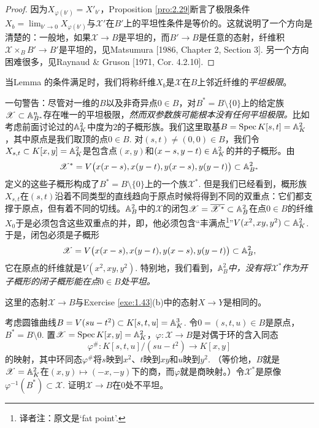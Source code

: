 \begin{proof}
因为$X_{\varphi(b')}=X'_{b'}$，Proposition \ref{pro:2.29}断言了极限条件$X_b=\lim_{b'\to 0}X_{\varphi(b')}$与$\mathscr{X}'$在$B'$上的平坦性条件是等价的。这就说明了一个方向是清楚的：一般地，如果$\mathscr{X}\to B$是平坦的，而$B'\to B$是任意的态射，纤维积$\mathscr{X}\times_B B'\to B'$是平坦的，见Matsumura [1986, Chapter 2, Section 3]. 另一个方向困难很多，见Raynaud \& Gruson [1971, Cor. 4.2.10].
\end{proof}

当Lemma \thethm 的条件满足时，我们将称纤维$X_b$是$\mathscr{X}$在$B$上邻近纤维的\textit{平坦极限}。

一句警告：尽管对一维的$B$以及非奇异点$0\in B$，对$B^*=B\setminus \{0\}$上的给定族$\mathscr{X}\subset \mathbb{A}_{B^*}^n$存在唯一的平坦极限，\textit{然而双参数族可能根本没有任何平坦极限。}比如考虑前面讨论过的$\mathbb{A}_K^2$中度为$2$的子概形族。我们这里取基$B=\operatorname{Spec} K[s,t]=\mathbb{A}_{K}^2$，其中原点是我们取顶的点$0\in B$. 对$(s,t)\neq (0,0)\in B$，我们令$X_{s,t}\subset K[x,y]=\mathbb{A}_K^2$是包含点$(x,y)$和$(x-s,y-t)\in \mathbb{A}_K^2$的并的子概形。由
\[
	\mathscr{X}^*=V\bigl(x(x-s),x(y-t),y(x-s),y(y-t)\bigr)\subset \mathbb{A}_{B^*}^2
\]
定义的这些子概形构成了$B^*=B\setminus \{0\}$上的一个族$\mathscr{X}^*$. 但是我们已经看到，概形族$X_{s,t}$在$(s,t)$沿着不同类型的直线趋向于原点时候将得到不同的双重点：它们都支撑于原点，但有着不同的切线。$\mathbb{A}_B^2$中的$\mathscr{X}$的闭包$\mathscr{X}=\overline{\mathscr{X}^*}\subset \mathbb{A}_B^2$在点$0\in B$的纤维$X_0$于是必须包含这些双重点的并，即，他必须包含“丰满点\footnote{译者注：原文是`fat point'.}”$V(x^2,xy,y^2)\subset \mathbb{A}_K^2$. 于是，闭包必须是子概形
\[
	\mathscr{X}=V\bigl(x(x-s),x(y-t),y(x-s),y(y-t)\bigr)\subset \mathbb{A}_{B}^2,
\]
它在原点的纤维就是$V(x^2,xy,y^2)$. 特别地，我们看到，\textit{$\mathbb{A}_B^2$中，没有将$\mathscr{X}^*$作为开子概形的闭子概形能在点$0\in B$处平坦。}

这里的态射$\mathscr{X}\to B$与Exercise \ref{exe:1.43}(b)中的态射$X\to Y$是相同的。

\begin{exe}
考虑圆锥曲线$B=V(su-t^2)\subset K[s,t,u]=\mathbb{A}_K^3$. 令$0=(s,t,u)\in B$是原点，$B^*=B\setminus {0}$. 置$\mathscr{X}=\operatorname{Spec} K[x,y]=\mathbb{A}_K^2$，$\varphi:\mathscr{X}\to B$是对偶于环的含入同态
\[
	\varphi^{\#}:K[s,t,u]/(su-t^2)\to K[x,y]
\]
的映射，其中环同态$\varphi^{\#}$将$s$映到$x^2$、$t$映到$xy$和$u$映到$y^2$. （等价地，$B$就是$\mathscr{X}=\mathbb{A}_K^2$在$(x,y)\mapsto (-x,-y)$下的商，而$\varphi$就是商映射。）令$\mathscr{X}^*$是原像$\varphi^{-1}(B^*)\subset \mathscr{X}$. 证明$\mathscr{X}\to B$在$0$处不平坦。
\end{exe}

